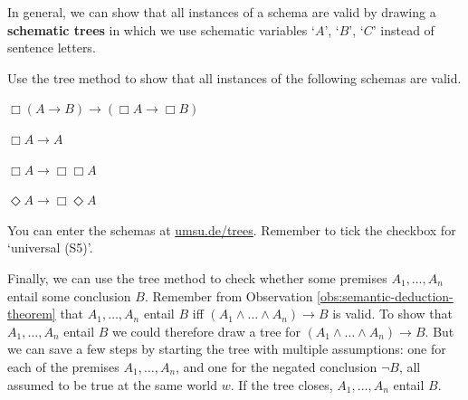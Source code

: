 In general, we can show that all instances of a schema are valid by drawing a
\textbf{schematic trees} in which we use schematic variables `$A$', `$B$', `$C$'
instead of sentence letters.

\begin{exercise}
  Use the tree method to show that all instances of the following schemas are valid.
  \par\nobreak %
  \begin{exlist}
   \item[\pr{K}] $\Box (A \to B) \to (\Box A \to \Box B)$
   \item[\pr{T}] $\Box A \to A$
   \item[\pr{4}] $\Box A \to \Box \Box A$
   \item[\pr{5}] $\Diamond A \to \Box \Diamond A$
  \end{exlist}
\end{exercise}
\begin{solution}
  You can enter the schemas at
  \href{https://www.umsu.de/trees/}{umsu.de/trees}. Remember to tick the checkbox for `universal (S5)'.
\end{solution}

Finally, we can use the tree method to check whether some premises
$A_{1},\ldots,A_{n}$ entail some conclusion $B$. Remember from Observation
\ref{obs:semantic-deduction-theorem} that $A_{1},\ldots,A_{n}$ entail $B$ iff
$(A_1\land\ldots\land A_n) \to B$ is valid. To show that $A_{1},\ldots,A_{n}$
entail $B$ we could therefore draw a tree for $(A_1\land\ldots\land A_n) \to B$.
But we can save a few steps by starting the tree with multiple assumptions: one
for each of the premises $A_{1},\ldots, A_{n}$, and one for the negated
conclusion $\neg B$, all assumed to be true at the same world $w$. If the tree
closes, $A_1,\ldots,A_n$ entail $B$.

